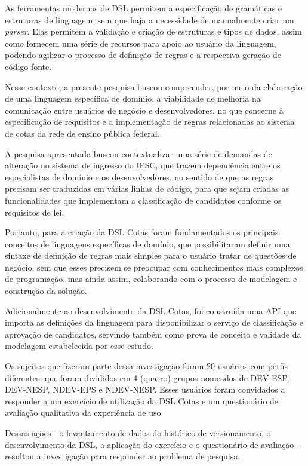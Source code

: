 As ferramentas modernas de \gls{DSL} permitem a especificação de gramáticas e estruturas de linguagem, sem que haja a necessidade de manualmente criar um \textit{parser}. Elas permitem a validação e criação de estruturas e tipos de dados, assim como fornecem uma série de recursos para apoio ao usuário da linguagem, podendo agilizar o processo de definição de regras e a respectiva geração de código fonte.

Nesse contexto, a presente pesquisa buscou compreender, por meio da elaboração de uma linguagem específica de domínio, a viabilidade de melhoria na comunicação entre usuários de negócio e desenvolvedores, no que concerne à especificação de requisitos e a implementação de regras relacionadas ao sistema de cotas da rede de ensino pública federal.

A pesquisa apresentada buscou contextualizar uma série de demandas de alteração no sistema de ingresso do \gls{IFSC}, que trazem dependência entre os especialistas de domínio e os desenvolvedores, no sentido de que as regras precisam ser traduzidas em várias linhas de código, para que sejam criadas as funcionalidades que implementam a classificação de candidatos conforme os requisitos de lei.

Portanto, para a criação da DSL Cotas foram fundamentados os principais conceitos de linguagens específicas de domínio, que possibilitaram definir uma sintaxe de definição de regras mais simples para o usuário tratar de questões de negócio, sem que esses precisem se preocupar com conhecimentos mais complexos de programação, mas ainda assim, colaborando com o processo de modelagem e construção da solução.

Adicionalmente ao desenvolvimento da DSL Cotas, foi construída uma \gls{API} que importa as definições da linguagem para disponibilizar o serviço de classificação e aprovação de candidatos, servindo também como prova de conceito e validade da modelagem estabelecida por esse estudo.

Os sujeitos que fizeram parte dessa investigação foram 20 usuários com perfis diferentes, que foram divididos em 4 (quatro) grupos nomeados de DEV-ESP, DEV-NESP, NDEV-EPS e NDEV-NESP. Esses usuários foram convidados a responder a um exercício de utilização da DSL Cotas e um questionário de avaliação qualitativa da experiência de uso. 
 
Dessas ações - o levantamento de dados do histórico de versionamento, o desenvolvimento da DSL, a aplicação do exercício e o questionário de avaliação - resultou a investigação para responder ao problema de pesquisa. 

